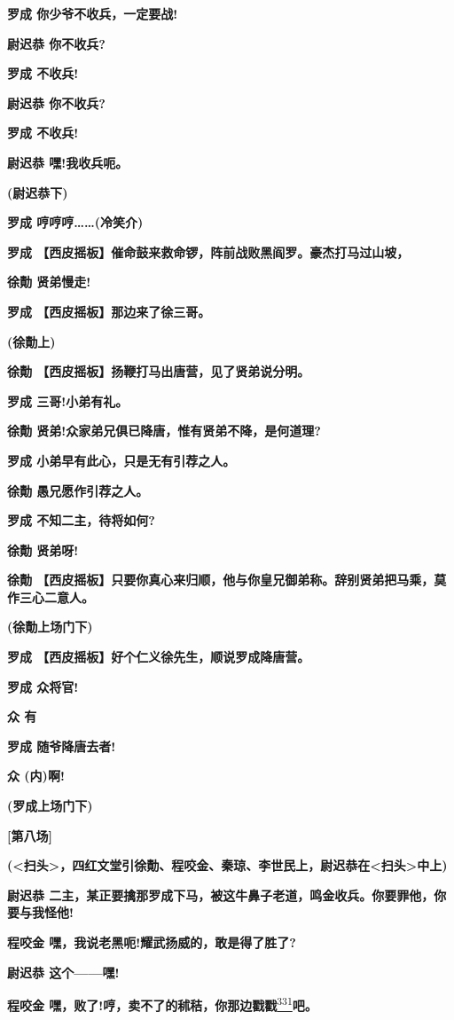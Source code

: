 \textbf{罗成 你少爷不收兵，一定要战!}

\textbf{尉迟恭 你不收兵?}

\textbf{罗成 不收兵!}

\textbf{尉迟恭 你不收兵?}

\textbf{罗成 不收兵!}

\textbf{尉迟恭 嘿!我收兵呃。}

\textbf{(尉迟恭下)}

\textbf{罗成 哼哼哼\ldots{}\ldots{}(冷笑介)}

\textbf{罗成
【西皮摇板】催命鼓来救命锣，阵前战败黑阎罗。豪杰打马过山坡，}

\textbf{徐勣 贤弟慢走!}

\textbf{罗成 【西皮摇板】那边来了徐三哥。}

\textbf{(徐勣上)}

\textbf{徐勣 【西皮摇板】扬鞭打马出唐营，见了贤弟说分明。}

\textbf{罗成 三哥!小弟有礼。}

\textbf{徐勣 贤弟!众家弟兄俱已降唐，惟有贤弟不降，是何道理?}

\textbf{罗成 小弟早有此心，只是无有引荐之人。}

\textbf{徐勣 愚兄愿作引荐之人。}

\textbf{罗成 不知二主，待将如何?}

\textbf{徐勣 贤弟呀!}

\textbf{徐勣
【西皮摇板】只要你真心来归顺，他与你皇兄御弟称。辞别贤弟把马乘，莫作三心二意人。}

\textbf{(徐勣上场门下)}

\textbf{罗成 【西皮摇板】好个仁义徐先生，顺说罗成降唐营。}

\textbf{罗成 众将官!}

\textbf{众 有}

\textbf{罗成 随爷降唐去者!}

\textbf{众 (内)啊!}

\textbf{(罗成上场门下)}

\textbf{{[}第八场{]}}

\textbf{(\textless{}扫头\textgreater{}，四红文堂引徐勣、程咬金、秦琼、李世民上，尉迟恭在\textless{}扫头\textgreater{}中上)}

\textbf{尉迟恭
二主，某正要擒那罗成下马，被这牛鼻子老道，鸣金收兵。你要罪他，你要与我怪他!}

\textbf{程咬金 嘿，我说老黑呃!耀武扬威的，敢是得了胜了?}

\textbf{尉迟恭 这个------嘿!}

\textbf{程咬金
嘿，败了!哼，卖不了的秫秸，你那边戳戳}\protect\hyperlink{fn331}{\textsuperscript{331}}\textbf{吧。}

